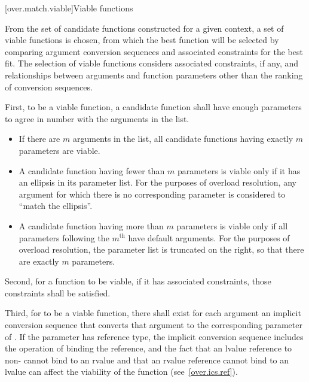 %

[over.match.viable]{Viable functions}%

\pnum
From the set of candidate functions constructed for a given
context, a set of viable functions is
chosen, from which the best function will be selected by
comparing argument conversion sequences
and associated constraints
for the best fit.
The selection of viable functions considers
associated constraints, if any, and
relationships between arguments and function parameters other
than the ranking of conversion sequences.

\pnum
{}%
%
First, to be a viable function, a candidate function shall have
enough parameters to agree in number with the arguments in the
list.

\begin{itemize}
\item
If there are $m$ arguments in the list,
all candidate functions having exactly $m$ parameters are viable.
\item
A candidate function having fewer than $m$ parameters is viable
only if it has an ellipsis in its parameter list.
For the purposes of overload resolution,
any argument for which there is no corresponding parameter is
considered to ``match the ellipsis''.
\item
A candidate function having more than $m$ parameters is viable
only if all parameters following the $m^\text{th}$
have default arguments.
For the purposes of overload resolution,
the parameter list is truncated on the right,
so that there are exactly $m$ parameters.
\end{itemize}

\pnum
Second, for a function to be viable, if it has associated constraints,
those constraints shall be satisfied.

\pnum
Third, for
to be a viable function, there shall exist for each
argument an
implicit conversion sequence that
converts that argument to the corresponding parameter of
.
If the parameter has reference type, the implicit conversion sequence
includes the operation of binding the reference, and the fact that
an lvalue reference to non- cannot bind to an rvalue
and that an rvalue reference cannot bind to an lvalue
can affect
the viability of the function (see~\ref{over.ics.ref}).

